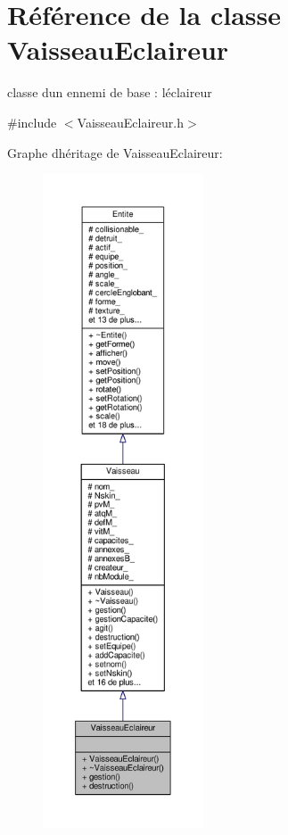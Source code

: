 \hypertarget{class_vaisseau_eclaireur}{}\section{Référence de la classe Vaisseau\+Eclaireur}
\label{class_vaisseau_eclaireur}


classe d\textquotesingle{}un ennemi de base \+: l\textquotesingle{}éclaireur  




{\ttfamily \#include $<$Vaisseau\+Eclaireur.\+h$>$}



Graphe d\textquotesingle{}héritage de Vaisseau\+Eclaireur\+:\nopagebreak
\begin{figure}[H]
\begin{center}
\leavevmode
\includegraphics[height=550pt]{class_vaisseau_eclaireur__inherit__graph}
\end{center}
\end{figure}


